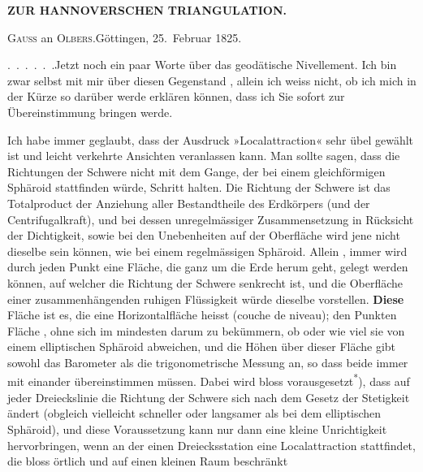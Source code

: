 \noindent\null\hfill{\small\textbf{ZUR HANNOVERSCHEN TRIANGULATION.}}\hfill{}\par\medskip

\begin{center}
\textsc{Gauss} an \textsc{Olbers}.\quad Göttingen, 25.~Februar 1825.
\end{center}

\par\noindent\hspace*{\parindent}\mbox{.\ .\ .\ .\ .\ .}\quad Jetzt noch ein paar Worte über das geodätische Nivellement.
Ich bin zwar selbst mit mir über diesen Gegenstand ,
allein ich weiss nicht, ob ich mich in der Kürze so darüber werde erklären
können, dass ich Sie sofort zur Übereinstimmung bringen werde.

\par\noindent\hspace*{\parindent}Ich habe immer geglaubt, dass der Ausdruck »Localattraction« sehr
übel gewählt ist und leicht verkehrte Ansichten veranlassen kann. Man
sollte sagen, dass die Richtungen der Schwere nicht mit dem Gange, der bei
einem gleichförmigen Sphäroid stattfinden würde, Schritt halten. Die
Richtung der Schwere ist das Totalproduct der Anziehung aller Bestandtheile des
Erdkörpers (und der Centrifugalkraft), und bei dessen unregelmässiger
Zusammensetzung in Rücksicht der Dichtigkeit, sowie bei den Unebenheiten auf
der Oberfläche wird jene nicht dieselbe sein können, wie bei einem
regelmässigen Sphäroid. Allein , immer
wird durch jeden Punkt eine Fläche, die ganz um die Erde herum geht,
gelegt werden können, auf welcher die Richtung der Schwere  senkrecht
ist, und die Oberfläche einer zusammenhängenden ruhigen Flüssigkeit würde
dieselbe vorstellen. \textbf{Diese} Fläche ist es, die eine Horizontalfläche heisst (couche
de niveau); den Punkten  Fläche , ohne
sich im mindesten darum zu bekümmern, ob oder wie viel sie von einem
elliptischen Sphäroid abweichen, und die Höhen über dieser Fläche gibt sowohl
das Barometer als die trigonometrische Messung an, so dass beide immer mit
einander übereinstimmen müssen. Dabei wird bloss vorausgesetzt\textsuperscript{*}), dass auf
jeder Dreieckslinie die Richtung der Schwere sich nach dem Gesetz der
Stetigkeit ändert (obgleich vielleicht schneller oder langsamer als bei dem
elliptischen Sphäroid), und diese Voraussetzung kann nur dann eine kleine
Unrichtigkeit hervorbringen, wenn an der einen Dreiecksstation eine 
Localattraction stattfindet, die bloss örtlich und auf einen kleinen Raum beschränkt

